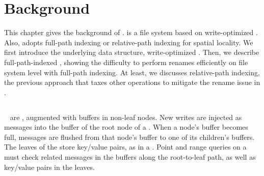 \chapter{Background}
\label{chap:bg}

This chapter gives the background of \betrfs.
\betrfs is a file system based on write-optimized \bets.
Also, \betrfs adopts full-path indexing or relative-path indexing for spatial
locality.
We first introduce the underlying data structure, write-optimized \bets.
Then, we describe full-path-indexed \betrfs,
showing the difficulty to perform renames efficiently on file system level
with full-path indexing.
At least, we discusses relative-path indexing, the previous approach that
taxes other operations to mitigate the rename issue in \betrfs.

\section{\bets}
\label{sec:bet}

\bets~\citep{bet,betlogin} are \btrees, augmented with buffers in non-leaf
nodes.
New writes are injected as messages into the buffer of the root node of a \bet.
When a node's buffer becomes full, messages are flushed from that node's buffer
to one of its children's buffers.
The leaves of the \bet store key/value pairs, as in a \btree.
Point and range queries on a \bet must check related messages in the buffers
along the root-to-leaf path, as well as key/value pairs in the leaves.

